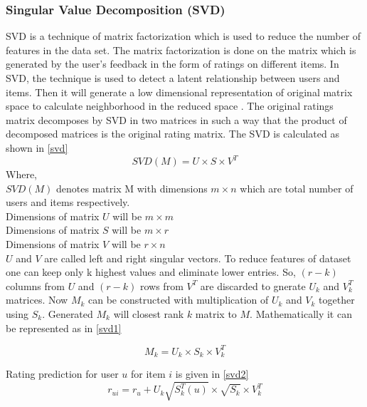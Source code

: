 \subsubsection{Singular Value Decomposition (SVD)}
SVD is a technique of matrix factorization which is used to reduce the number of features in the data set. The matrix factorization is done on the matrix which is generated by the user's feedback in the form of ratings on different items. In SVD, the technique is used to detect a latent relationship between users and items. Then it will generate a low dimensional representation of original matrix space to calculate neighborhood in the reduced space \cite{32}. The original ratings matrix decomposes by SVD in two matrices in such a way that the product of decomposed matrices is the original rating matrix. The SVD is calculated as shown in \autoref{svd}
\begin{equation}
SVD(M) = U \times S \times V^{T} 
\label{svd}
\end{equation}
\noindent Where,\\
$SVD(M)$ denotes matrix M with dimensions $m \times n$ which are total number of users and items respectively.\\
Dimensions of matrix $U$ will be $m \times m$ \\
Dimensions of matrix $S$ will be $m \times r$ \\
Dimensions of matrix $V$ will be $r \times n$ \\
$U$ and $V$ are called left and right singular vectors. To reduce features of dataset one can keep only k highest values and eliminate lower entries. So, $(r-k)$ columns from $U$ and $(r-k)$ rows from $V^{T}$ are discarded to gnerate $U_{k}$ and $V_{k}^{T}$ matrices. Now $M_{k}$ can be constructed with multiplication of $U_{k}$ and $V_{k}$ together using $S_{k}$. Generated $M_{k}$ will closest rank $k$ matrix to $M$. Mathematically it can be represented as in \autoref{svd1}

\begin{equation}
M_{k} = U_{k} \times S_{k} \times V_{k}^{T} 
\label{svd1}
\end{equation}

\noindent Rating prediction for user $u$ for item $i$ is given in \autoref{svd2} \\

\begin{equation}
r_{ui} = r_{u} + U_{k} \sqrt{S_{k}^{T} (u)} \times \sqrt{S_k} \times V_{k}^{T}
\label{svd2}
\end{equation}

